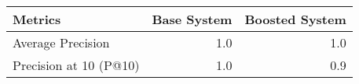 \begin{tabular}{lrr}
\toprule
               Metrics &  Base System &  Boosted System \\
\midrule
     Average Precision &          1.0 &             1.0 \\
Precision at 10 (P@10) &          1.0 &             0.9 \\
\bottomrule
\end{tabular}
